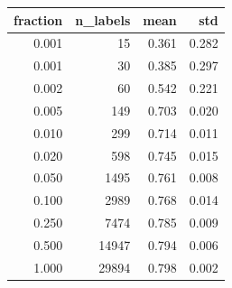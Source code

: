 \begin{tabular}{rrrr}
\toprule
fraction & n_labels & mean & std \\
\midrule
0.001 & 15 & 0.361 & 0.282 \\
0.001 & 30 & 0.385 & 0.297 \\
0.002 & 60 & 0.542 & 0.221 \\
0.005 & 149 & 0.703 & 0.020 \\
0.010 & 299 & 0.714 & 0.011 \\
0.020 & 598 & 0.745 & 0.015 \\
0.050 & 1495 & 0.761 & 0.008 \\
0.100 & 2989 & 0.768 & 0.014 \\
0.250 & 7474 & 0.785 & 0.009 \\
0.500 & 14947 & 0.794 & 0.006 \\
1.000 & 29894 & 0.798 & 0.002 \\
\bottomrule
\end{tabular}
